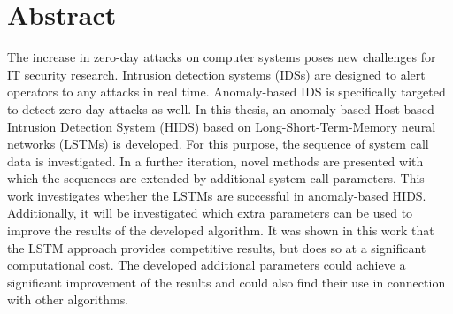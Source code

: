 \begingroup
\let\clearpage\relax
\let\cleardoublepage\relax
\let\cleardoublepage\relax

\chapter*{Abstract}
 The increase in zero-day attacks on computer systems poses new challenges for IT security research.
 Intrusion detection systems (IDSs) are designed to alert operators to any attacks in real time.
 Anomaly-based IDS is specifically targeted to detect zero-day attacks as well.
 In this thesis, an anomaly-based Host-based Intrusion Detection System (HIDS) based on Long-Short-Term-Memory neural networks (LSTMs) is developed.
 For this purpose, the sequence of system call data is investigated.
 In a further iteration, novel methods are presented with which the sequences are extended by additional system call parameters.
 This work investigates whether the LSTMs are successful in anomaly-based HIDS.\@
 Additionally, it will be investigated which extra parameters can be used to improve the results of the developed algorithm.
 It was shown in this work that the LSTM approach provides competitive results, but does so at a significant computational cost.
 The developed additional parameters could achieve a significant improvement of the results and could also find their use in connection with other algorithms.

\vfill

